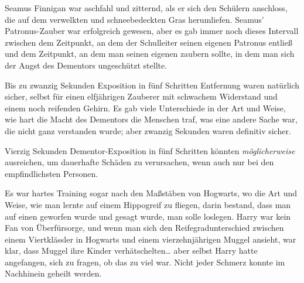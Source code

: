 \later

Seamus Finnigan war aschfahl und zitternd, als er sich den Schülern anschloss, die auf dem verwelkten und schneebedeckten Gras herumliefen. Seamus' Patronus-Zauber war erfolgreich gewesen, aber es gab immer noch dieses Intervall zwischen dem Zeitpunkt, an dem der Schulleiter seinen eigenen Patronus entließ und dem Zeitpunkt, an dem man seinen eigenen zaubern sollte, in dem man sich der Angst des Dementors ungeschützt stellte.

Bis zu zwanzig Sekunden Exposition in fünf Schritten Entfernung waren natürlich sicher, selbst für einen elfjährigen Zauberer mit schwachem Widerstand und einem noch reifenden Gehirn. Es gab viele Unterschiede in der Art und Weise, wie hart die Macht des Dementors die Menschen traf, was eine andere Sache war, die nicht ganz verstanden wurde; aber zwanzig Sekunden waren definitiv sicher.

Vierzig Sekunden Dementor-Exposition in fünf Schritten könnten \emph{möglicherweise} ausreichen, um dauerhafte Schäden zu verursachen, wenn auch nur bei den empfindlichsten Personen.

Es war hartes Training sogar nach den Maßstäben von Hogwarts, wo die Art und Weise, wie man lernte auf einem Hippogreif zu fliegen, darin bestand, dass man auf einen geworfen wurde und gesagt wurde, man solle loslegen. Harry war kein Fan von Überfürsorge, und wenn man sich den Reifegradunterschied zwischen einem Viertklässler in Hogwarts und einem vierzehnjährigen Muggel ansieht, war klar, dass Muggel ihre Kinder verhätschelten… aber selbst Harry hatte angefangen, sich zu fragen, ob das zu viel war. Nicht jeder Schmerz konnte im Nachhinein geheilt werden.

